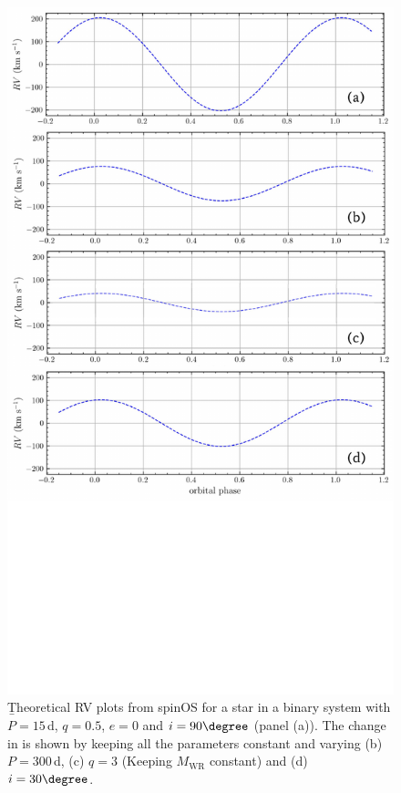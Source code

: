 \begin{figure}
    \centering
    \includegraphics[width=\hsize]{chapters/introduction/image/Thesis_RV.pdf}
    \caption{\b{Theoretical RV plots from spinOS \citep[][]{2021Fabry} for a star in a binary system with $P=15\,$d, $q=0.5$, $e=0$ and $i=90\degree$ (panel (a)). The change in \DelRV{} is shown by keeping all the parameters constant and varying (b) $P=300\,$d, (c) $q=3$ (Keeping $M_{\textrm{WR}}$ constant) and (d) $i=30\degree$.} }
    \label{fig:rv_model}
\end{figure}

